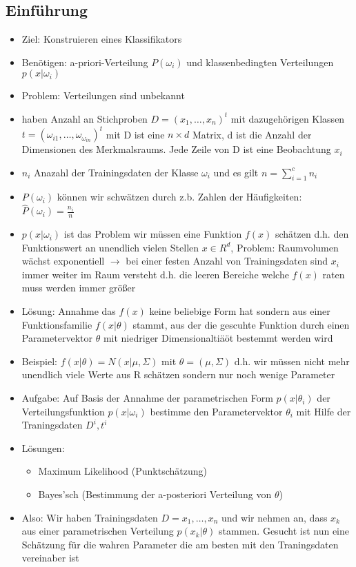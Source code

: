 \documentclass{article} %
\begin{document}
	\subsection{Einführung}
	\begin{itemize}
		\item Ziel: Konstruieren eines Klassifikators
		\item Benötigen: a-priori-Verteilung $P(\omega_i)$ und klassenbedingten Verteilungen $p(x|\omega_i)$
		\item Problem: Verteilungen sind unbekannt
		\item haben Anzahl an Stichproben $D=(x_1,\dots,x_n)^t$ mit dazugehörigen Klassen $t=(\omega_{i1},\dots,\omega_{\omega_{in}})^t$ mit D ist eine $n \times d$ Matrix, d ist die Anzahl der Dimensionen des Merkmalsraums. Jede Zeile von D ist eine Beobachtung $x_i$
		\item $n_i$ Anazahl der Trainingsdaten der Klasse $\omega_i$ und es gilt $n = \sum_{i=1}^{c} n_i$
		\item $P(\omega_i)$ können wir schwätzen durch z.b. Zahlen der Häufigkeiten: $\hat{P}(\omega_i) = \frac{n_i}{n}$
		\item $p(x|\omega_i)$ ist das Problem wir müssen eine Funktion $f(x)$ schätzen d.h. den Funktionswert an unendlich vielen Stellen $x\in R^d$, Problem: Raumvolumen wächst exponentiell $\rightarrow$ bei einer festen Anzahl von Trainingsdaten sind $x_i$ immer weiter im Raum versteht d.h. die leeren Bereiche welche $f(x)$ raten muss werden immer größer
		\item Lösung: Annahme das $f(x)$ keine beliebige Form hat sondern aus einer Funktionsfamilie $f(x|\theta)$ stammt, aus der die gescuhte Funktion durch einen Parametervektor $\theta$ mit niedriger Dimensionaltiäöt bestemmt werden wird
		\item Beispiel: $f(x|\theta) = N(x|\mu,\Sigma)$ mit $\theta = (\mu,\Sigma)$ d.h. wir müssen nicht mehr unendlich viele Werte aus R schätzen sondern nur noch wenige Parameter
		\item Aufgabe: Auf Basis der Annahme der parametrischen Form $p(x|\theta_i)$ der Verteilungsfunktion $p(x|\omega_i)$ bestimme den Parametervektor $\theta_i$ mit Hilfe der Traningsdaten $D^i,t^i$
		\item Lösungen:
		\begin{itemize}
			\item Maximum Likelihood (Punktschätzung)
			\item Bayes'sch (Bestimmung der a-posteriori Verteilung von $\theta$)
		\end{itemize}
		\item Also: Wir haben Trainingsdaten $D = x_1,\dots,x_n$ und wir nehmen an, dass $x_k$ aus einer parametrischen Verteilung $p(x_k|\theta)$ stammen. Gesucht ist nun eine Schätzung für die wahren Parameter die am besten mit den Traningsdaten vereinaber ist
	\end{itemize}
\end{document}
